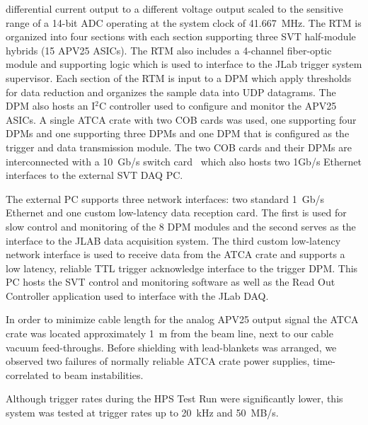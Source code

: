 \documentclass[final,3p,times,twocolumn]{elsarticle}
\begin{document}
differential current output to a different voltage output scaled to the sensitive range of a 14-bit ADC 
operating at the system clock of 41.667~MHz. The RTM is organized 
into four sections with each section supporting three SVT half-module hybrids (15 APV25 ASICs). The 
RTM also includes a 4-channel fiber-optic module and supporting logic which is used to interface 
to the JLab trigger system supervisor. Each section of the RTM is input to a DPM which apply 
thresholds for data reduction and organizes the sample data into UDP datagrams. The DPM also hosts 
an I$^{2}$C controller used to configure and monitor the APV25 ASICs. A single ATCA crate with two 
COB cards was used, one supporting four DPMs and one supporting three DPMs and one DPM that is 
configured as the trigger and data transmission module. The two COB cards and their DPMs are 
interconnected with a 10~Gb/s switch card~\cite{Larsen:2011zb} which also hosts two 1Gb/s Ethernet 
interfaces to the external SVT DAQ PC.  

The external PC supports three network interfaces: two standard 1~Gb/s Ethernet and one custom 
low-latency data reception card. The first is used for slow control and monitoring of the 8 
DPM modules and the second serves as the interface to the JLAB data acquisition system. The third 
custom low-latency network interface is used to receive data from the ATCA crate and supports a low 
latency, reliable TTL trigger acknowledge interface to the trigger DPM. This PC hosts the SVT control 
and monitoring software as well as the Read Out Controller application used to interface with the 
JLab DAQ.

In order to minimize cable length for the analog APV25 output signal the ATCA crate was located 
approximately 1~m from the beam line, next to our cable vacuum feed-throughs.   
Before shielding with lead-blankets was arranged, we observed two failures of normally reliable ATCA 
crate power supplies, time-correlated to beam instabilities. 

Although trigger rates during the HPS Test Run were significantly lower, this system was tested at 
trigger rates up to 20~kHz and 50~MB/s. 
\end{document}
